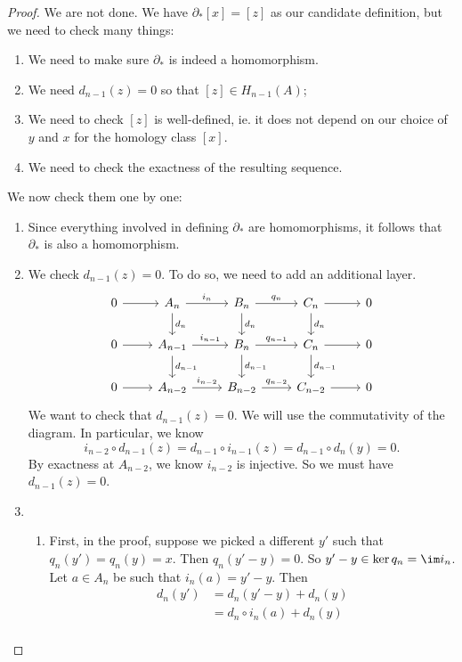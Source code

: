\documentclass[a4paper]{article}
\begin{document}
\begin{proof}
  We are not done. We have $\partial_* [x] = [z]$ as our candidate definition, but we need to check many things:
  \begin{enumerate}
    \item We need to make sure $\partial_*$ is indeed a homomorphism.
    \item We need $d_{n - 1}(z) = 0$ so that $[z] \in H_{n - 1}(A)$;
    \item We need to check $[z]$ is well-defined, ie. it does not depend on our choice of $y$ and $x$ for the homology class $[x]$.
    \item We need to check the exactness of the resulting sequence.
  \end{enumerate}
  We now check them one by one:
  \begin{enumerate}
    \item Since everything involved in defining $\partial_*$ are homomorphisms, it follows that $\partial_*$ is also a homomorphism.
    \item We check $d_{n - 1}(z) = 0$. To do so, we need to add an additional layer.
      \[
        \begin{tikzcd}
          0 \ar[r] & A_n \ar[r, "i_n"] \ar[d, "d_n"] & B_n \ar[r, "q_n"] \ar[d, "d_n"] & C_n \ar[r] \ar[d, "d_n"] & 0\\
          0 \ar[r] & A_{n - 1} \ar[r, "i_{n - 1}"] \ar[d, "d_{n - 1}"] & B_n \ar[r, "q_{n - 1}"] \ar[d, "d_{n - 1}"] & C_n \ar[r] \ar[d, "d_{n - 1}"] & 0\\
          0 \ar[r] & A_{n - 2} \ar[r, "i_{n - 2}"] & B_{n - 2} \ar[r, "q_{n - 2}"] & C_{n - 2} \ar[r] & 0
        \end{tikzcd}
      \]
      We want to check that $d_{n - 1}(z) = 0$. We will use the commutativity of the diagram. In particular, we know
      \[
        i_{n - 2} \circ d_{n - 1}(z) = d_{n - 1} \circ i_{n - 1} (z) = d_{n - 1} \circ d_n(y) = 0.
      \]
      By exactness at $A_{n - 2}$, we know $i_{n - 2}$ is injective. So we must have $d_{n - 1}(z) = 0$.
    \item
      \begin{enumerate}
        \item First, in the proof, suppose we picked a different $y'$ such that $q_n(y') = q_n(y) = x$. Then $q_n(y' - y) = 0$. So $y' - y \in \ker q_n = \im i_n$. Let $a \in A_n$ be such that $i_n(a) = y' - y$. Then
          \begin{align*}
            d_n(y') &= d_n(y' - y) + d_n(y) \\
            &= d_n \circ i_n (a) + d_n(y) \\

\end{align*}
\end{enumerate}
\end{enumerate}
\end{proof}
\end{document}
